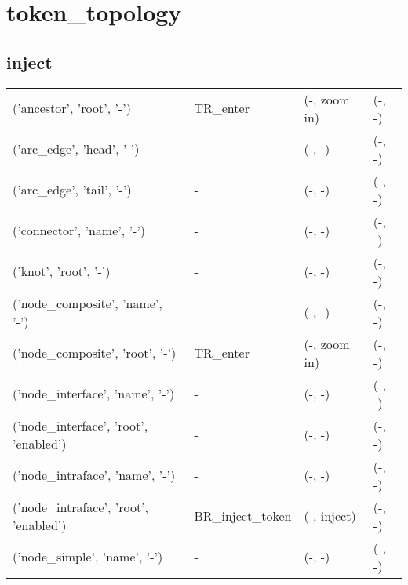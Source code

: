 \def\state#1{#1}
\def\object#1{#1}
\def\cursor#1{#1}
\def\leftnextstate#1{#1}
\def\leftaction#1{#1}
\def\rightnextstate#1{#1}
\def\rightaction#1{#1}
\section{token\_topology}
\subsection{inject}
\begin{tabular}{|l|l|l|l|}
\object{('ancestor', 'root', '-')} &\cursor{TR\_enter} &(\leftnextstate{-}, \leftaction{zoom in}) &(\rightnextstate{-}, \rightaction{-})\\
\object{('arc\_edge', 'head', '-')} &\cursor{-} &(\leftnextstate{-}, \leftaction{-}) &(\rightnextstate{-}, \rightaction{-})\\
\object{('arc\_edge', 'tail', '-')} &\cursor{-} &(\leftnextstate{-}, \leftaction{-}) &(\rightnextstate{-}, \rightaction{-})\\
\object{('connector', 'name', '-')} &\cursor{-} &(\leftnextstate{-}, \leftaction{-}) &(\rightnextstate{-}, \rightaction{-})\\
\object{('knot', 'root', '-')} &\cursor{-} &(\leftnextstate{-}, \leftaction{-}) &(\rightnextstate{-}, \rightaction{-})\\
\object{('node\_composite', 'name', '-')} &\cursor{-} &(\leftnextstate{-}, \leftaction{-}) &(\rightnextstate{-}, \rightaction{-})\\
\object{('node\_composite', 'root', '-')} &\cursor{TR\_enter} &(\leftnextstate{-}, \leftaction{zoom in}) &(\rightnextstate{-}, \rightaction{-})\\
\object{('node\_interface', 'name', '-')} &\cursor{-} &(\leftnextstate{-}, \leftaction{-}) &(\rightnextstate{-}, \rightaction{-})\\
\object{('node\_interface', 'root', 'enabled')} &\cursor{-} &(\leftnextstate{-}, \leftaction{-}) &(\rightnextstate{-}, \rightaction{-})\\
\object{('node\_intraface', 'name', '-')} &\cursor{-} &(\leftnextstate{-}, \leftaction{-}) &(\rightnextstate{-}, \rightaction{-})\\
\object{('node\_intraface', 'root', 'enabled')} &\cursor{BR\_inject\_token} &(\leftnextstate{-}, \leftaction{inject}) &(\rightnextstate{-}, \rightaction{-})\\
\object{('node\_simple', 'name', '-')} &\cursor{-} &(\leftnextstate{-}, \leftaction{-}) &(\rightnextstate{-}, \rightaction{-})\\

\end{tabular}
